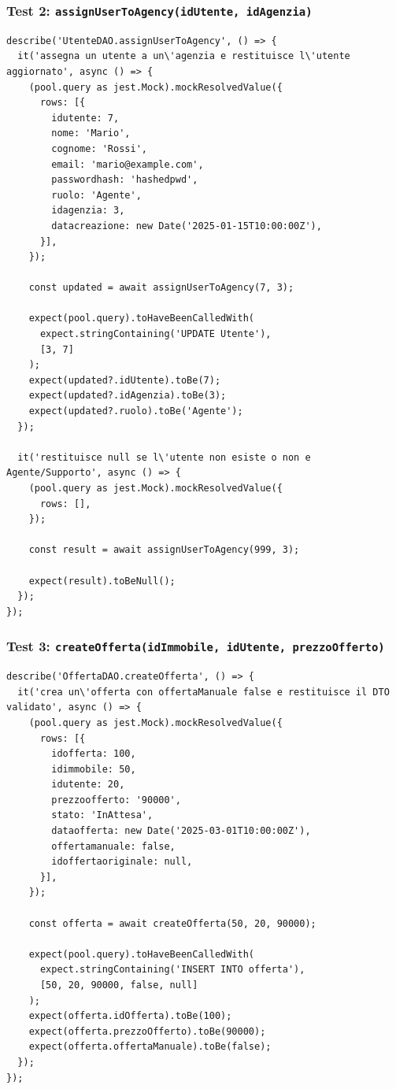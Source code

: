 \documentclass[a4paper,11pt]{article}
\begin{document}
\subsubsection{Test 2: \texttt{assignUserToAgency(idUtente, idAgenzia)}}
\begin{lstlisting}[style=projectcode]
describe('UtenteDAO.assignUserToAgency', () => {
  it('assegna un utente a un\'agenzia e restituisce l\'utente aggiornato', async () => {
    (pool.query as jest.Mock).mockResolvedValue({
      rows: [{
        idutente: 7,
        nome: 'Mario',
        cognome: 'Rossi',
        email: 'mario@example.com',
        passwordhash: 'hashedpwd',
        ruolo: 'Agente',
        idagenzia: 3,
        datacreazione: new Date('2025-01-15T10:00:00Z'),
      }],
    });

    const updated = await assignUserToAgency(7, 3);

    expect(pool.query).toHaveBeenCalledWith(
      expect.stringContaining('UPDATE Utente'),
      [3, 7]
    );
    expect(updated?.idUtente).toBe(7);
    expect(updated?.idAgenzia).toBe(3);
    expect(updated?.ruolo).toBe('Agente');
  });

  it('restituisce null se l\'utente non esiste o non e Agente/Supporto', async () => {
    (pool.query as jest.Mock).mockResolvedValue({
      rows: [],
    });

    const result = await assignUserToAgency(999, 3);

    expect(result).toBeNull();
  });
});
\end{lstlisting}

\subsubsection{Test 3: \texttt{createOfferta(idImmobile, idUtente, prezzoOfferto)}}
\begin{lstlisting}[style=projectcode]
describe('OffertaDAO.createOfferta', () => {
  it('crea un\'offerta con offertaManuale false e restituisce il DTO validato', async () => {
    (pool.query as jest.Mock).mockResolvedValue({
      rows: [{
        idofferta: 100,
        idimmobile: 50,
        idutente: 20,
        prezzoofferto: '90000',
        stato: 'InAttesa',
        dataofferta: new Date('2025-03-01T10:00:00Z'),
        offertamanuale: false,
        idoffertaoriginale: null,
      }],
    });

    const offerta = await createOfferta(50, 20, 90000);

    expect(pool.query).toHaveBeenCalledWith(
      expect.stringContaining('INSERT INTO offerta'),
      [50, 20, 90000, false, null]
    );
    expect(offerta.idOfferta).toBe(100);
    expect(offerta.prezzoOfferto).toBe(90000);
    expect(offerta.offertaManuale).toBe(false);
  });
});
\end{lstlisting}
\end{document}
